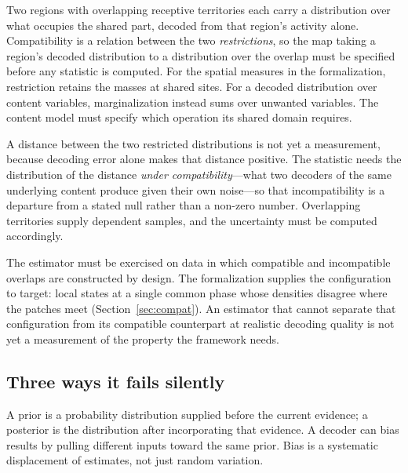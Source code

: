 \documentclass[11pt]{article}
\begin{document}
\begin{description}[leftmargin=*,style=nextline]
\item[A restriction map.] Two regions with overlapping receptive territories
each carry a distribution over what occupies the shared part, decoded from that
region's activity alone. Compatibility is a relation between the two
\emph{restrictions}, so the map taking a region's decoded distribution to a
distribution over the overlap must be specified before any statistic is
computed. For the spatial measures in the formalization, restriction retains
the masses at shared sites. For a decoded distribution over content variables,
marginalization instead sums over unwanted variables. The content model must
specify which operation its shared domain requires.
\item[A statistic with a null.] A distance between the two restricted
distributions is not yet a measurement, because decoding error alone makes that
distance positive. The statistic needs the distribution of the distance
\emph{under compatibility}---what two decoders of the same underlying content
produce given their own noise---so that incompatibility is a departure from a
stated null rather than a non-zero number. Overlapping territories supply
dependent samples, and the uncertainty must be computed accordingly.
\item[Validation where the answer is built rather than inferred.] The estimator
must be exercised on data in which compatible and incompatible overlaps are
constructed by design. The formalization supplies the configuration to target:
local states at a single common phase whose densities disagree where the
patches meet (Section~\ref{sec:compat}). An estimator that cannot separate that
configuration from its compatible counterpart at realistic decoding quality is
not yet a measurement of the property the framework needs.
\end{description}

\subsection{Three ways it fails silently}

A prior is a probability distribution supplied before the current evidence;
a posterior is the distribution after incorporating that evidence. A decoder
can bias results by pulling different inputs toward the same prior. Bias is
a systematic displacement of estimates, not just random variation.
\end{document}
